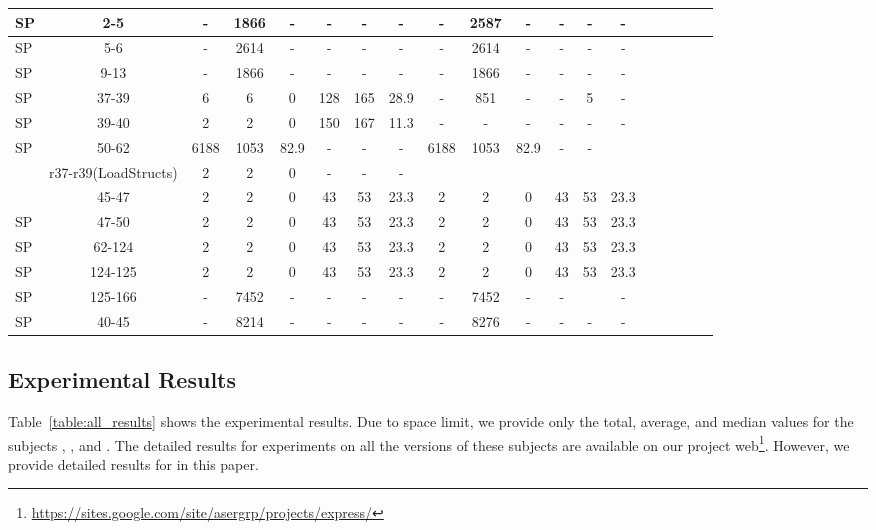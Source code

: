 {\begin{table*}
\begin{CodeOut}
\begin{center}
\begin {tabular} {|l|c|c|c|c|c|c|c|c|c|c|c|c|c|c|c|c|c|c|}
\hline
SP&2-5&-&1866&-&-&-&-&-&2587&-&-&-&-\\
\hline
SP&5-6&-&2614&-&-&-&-&-&2614&-&-&-&-\\
\hline
SP&9-13&-&1866&-&-&-&-&-&1866&-&-&-&-\\
\hline
SP&37-39&6&6&0&128&165&28.9&-&851&-&-&5&-\\
\hline
SP&39-40&2&2&0&150&167&11.3&-&-&-&-&-&-\\
\hline
SP&50-62&6188&1053&82.9&-&-&-&6188&1053&82.9&-&-&\\
\hline
\Comment{SP&r37-r39(LoadStructs)&2&2&0&-&-&-&&&&&&\\
\hline}
SP&45-47&2&2&0&43&53&23.3&2&2&0&43&53&23.3\\
\hline
SP&47-50&2&2&0&43&53&23.3&2&2&0&43&53&23.3\\
\hline
SP&62-124&2&2&0&43&53&23.3&2&2&0&43&53&23.3\\
\hline
SP&124-125&2&2&0&43&53&23.3&2&2&0&43&53&23.3\\
\hline
SP&125-166&-&7452&-&-&-&-&-&7452&-&-&&-\\
\hline
SP&40-45&-&8214&-&-&-&-&-&8276&-&-&-&-\\
\hline
\end{tabular}
\end{center}
\end{CodeOut}
\vspace{- 0.35 in}
\end{table*}
}


\subsection{Experimental Results}
Table~\ref{table:all_results} shows the experimental results. Due to space limit, we provide only  the total, average, and median values for the subjects , , and . The detailed results for experiments on all the versions of these subjects are available on our project web\footnote{\url{https://sites.google.com/site/asergrp/projects/express/}}.
However, we provide detailed results for  in this paper. 

